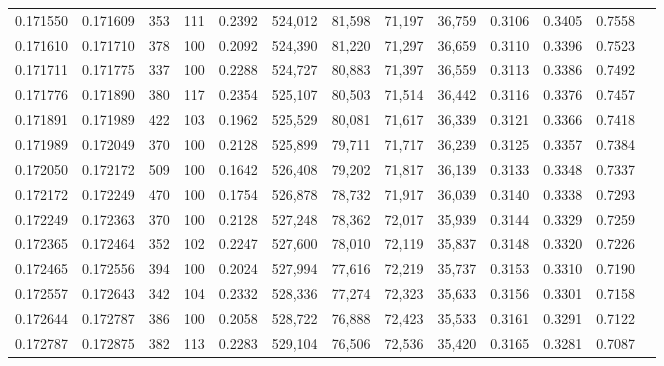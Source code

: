 \begin{tabular}{rrrrrrrrrrrrr}
0.171550 & 0.171609 &   353 & 111 &                                     0.2392 & 524,012 &  81,598 &  71,197 &  36,759 & 0.3106 & 0.3405 & 0.7558 \\
0.171610 & 0.171710 &   378 & 100 &                                     0.2092 & 524,390 &  81,220 &  71,297 &  36,659 & 0.3110 & 0.3396 & 0.7523 \\
0.171711 & 0.171775 &   337 & 100 &                                     0.2288 & 524,727 &  80,883 &  71,397 &  36,559 & 0.3113 & 0.3386 & 0.7492 \\
0.171776 & 0.171890 &   380 & 117 &                                     0.2354 & 525,107 &  80,503 &  71,514 &  36,442 & 0.3116 & 0.3376 & 0.7457 \\
0.171891 & 0.171989 &   422 & 103 &                                     0.1962 & 525,529 &  80,081 &  71,617 &  36,339 & 0.3121 & 0.3366 & 0.7418 \\
0.171989 & 0.172049 &   370 & 100 &                                     0.2128 & 525,899 &  79,711 &  71,717 &  36,239 & 0.3125 & 0.3357 & 0.7384 \\
0.172050 & 0.172172 &   509 & 100 &                                     0.1642 & 526,408 &  79,202 &  71,817 &  36,139 & 0.3133 & 0.3348 & 0.7337 \\
0.172172 & 0.172249 &   470 & 100 &                                     0.1754 & 526,878 &  78,732 &  71,917 &  36,039 & 0.3140 & 0.3338 & 0.7293 \\
0.172249 & 0.172363 &   370 & 100 &                                     0.2128 & 527,248 &  78,362 &  72,017 &  35,939 & 0.3144 & 0.3329 & 0.7259 \\
0.172365 & 0.172464 &   352 & 102 &                                     0.2247 & 527,600 &  78,010 &  72,119 &  35,837 & 0.3148 & 0.3320 & 0.7226 \\
0.172465 & 0.172556 &   394 & 100 &                                     0.2024 & 527,994 &  77,616 &  72,219 &  35,737 & 0.3153 & 0.3310 & 0.7190 \\
0.172557 & 0.172643 &   342 & 104 &                                     0.2332 & 528,336 &  77,274 &  72,323 &  35,633 & 0.3156 & 0.3301 & 0.7158 \\
0.172644 & 0.172787 &   386 & 100 &                                     0.2058 & 528,722 &  76,888 &  72,423 &  35,533 & 0.3161 & 0.3291 & 0.7122 \\
0.172787 & 0.172875 &   382 & 113 &                                     0.2283 & 529,104 &  76,506 &  72,536 &  35,420 & 0.3165 & 0.3281 & 0.7087 \\

\end{tabular}
